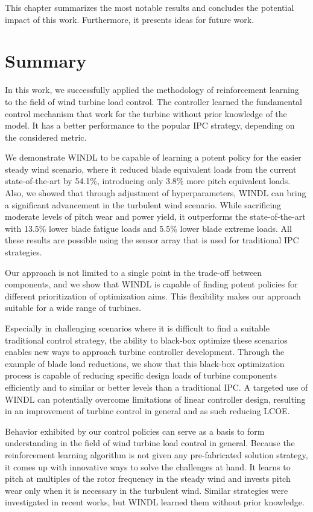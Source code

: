 \label{ch:conclusion}

This chapter summarizes the most notable results and concludes the potential impact of this work. Furthermore, it presents ideas for future work.

\section{Summary}

In this work, we successfully applied the methodology of reinforcement learning to the field of wind turbine load control. The controller learned the fundamental control mechanism that work for the turbine without prior knowledge of the model. It has a better performance to the popular IPC strategy, depending on the considered metric.

We demonstrate WINDL to be capable of learning a potent policy for the easier steady wind scenario, where it reduced blade equivalent loads from the current state-of-the-art by 54.1\%, introducing only 3.8\% more pitch equivalent loads. Also, we showed that through adjustment of hyperparameters, WINDL can bring a significant advancement in the turbulent wind scenario. While sacrificing moderate levels of pitch wear and power yield, it outperforms the state-of-the-art with 13.5\% lower blade fatigue loads and 5.5\% lower blade extreme loads. All these results are possible using the sensor array that is used for traditional IPC strategies.

Our approach is not limited to a single point in the trade-off between components, and we show that WINDL is capable of finding potent policies for different prioritization of optimization aims. This flexibility makes our approach suitable for a wide range of turbines.

Especially in challenging scenarios where it is difficult to find a suitable traditional control strategy, the ability to black-box optimize these scenarios enables new ways to approach turbine controller development. Through the example of blade load reductions, we show that this black-box optimization process is capable of reducing specific design loads of turbine components efficiently and to similar or better levels than a traditional IPC. A targeted use of WINDL can potentially overcome limitations of linear controller design, resulting in an improvement of turbine control in general and as such reducing \ac{LCOE}.

Behavior exhibited by our control policies can serve as a basis to form understanding in the field of wind turbine load control in general. Because the reinforcement learning algorithm is not given any pre-fabricated solution strategy, it comes up with innovative ways to solve the challenges at hand. It learns to pitch at multiples of the rotor frequency in the steady wind and invests pitch wear only when it is necessary in the turbulent wind. Similar strategies were investigated in recent works, but WINDL learned them without prior knowledge.


